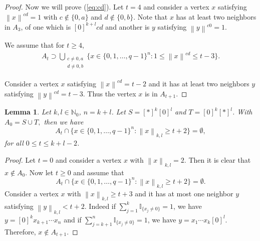 \documentclass[reqno,11pt]{amsart}
\newtheorem{lemma}[theorem]{Lemma}
\renewcommand{\leq}{\leqslant}
\renewcommand{\geq}{\geqslant}
\begin{document}
\begin{proof}
Now we will prove (\ref{eq:cd}). Let $t=4$ and consider a vertex $x$ satisfying $\left \lVert x \right \rVert^{cd}=1$ with $c\notin \{0,a\}$ and $d \notin \{0,b\}$. Note that $x$ has at least two neighbors in $A_3$, of one which is $[0]^{k+l}cd$ and another is $y$ satisfying $\left \lVert y \right \rVert^{c0}=1$. 

We assume that for $t \geq 4$,
\begin{align*}
 A_t \supset \bigcup_{\substack{c \neq 0,a \\ d \neq 0,b}} \{x \in \{0,1,\dots,q-1\}^n:  1 \leq \left \lVert x \right \rVert^{cd} \leq t-3\}.    
\end{align*}

Consider a vertex $x$ satisfying $\left \lVert x \right \rVert^{cd}=t-2$ and it has at least two neighbors $y$ satisfying $\left \lVert y \right \rVert^{cd}=t-3$. Thus the vertex $x$ is in $A_{t+1}$. 
\end{proof}



\begin{lemma} \label{lemma:ST4}
Let $k,l \in \mathbb{N}_0$, $n=k+l$. Let $S=[*]^k[0]^l$ and $T=[0]^k[*]^l$. With $A_0=S \cup T,$ then we have
$$A_t \cap \{x \in \{0,1,\dots,q-1\}^n: \left \lVert x \right \rVert_{k,l} \geq t+2\}=\emptyset,$$
for all $ 0 \leq t \leq k+l-2$.


\end{lemma}

\begin{proof}
Let $t=0$ and consider a vertex $x$ with $\left \lVert x \right \rVert_{k,l}=2$. Then it is clear that $x \notin A_0$. 
Now let $t \geq 0$ and assume that 
$$A_t \cap \{x \in \{0,1,\dots,q-1\}^n: \left \lVert x \right \rVert_{k,l} \geq t+2\}=\emptyset.$$
Consider a vertex $x$ with $\left \lVert x \right \rVert_{k,l} \geq t+3$ and it has at most one neighbor $y$ satisfying $\left \lVert y \right \rVert_{k,l} < t+2$. Indeed if $\sum_{j=1}^k \mathbb{I}_{\{x_j \neq 0\}}=1$, we have $y=[0]^kx_{k+1}\cdots x_n$ and if $\sum_{j=k+1}^n \mathbb{I}_{\{x_j \neq 0\}}=1$, we have $y=x_1 \cdots x_k[0]^{l}$. Therefore, $x \notin A_{t+1}$.
\end{proof}
\end{document}
